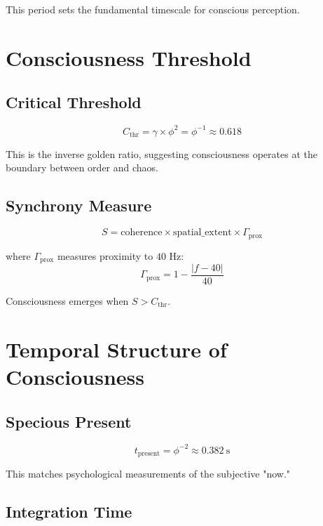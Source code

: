 \documentclass[12pt,a4paper]{article}
\begin{document}
This period sets the fundamental timescale for conscious perception.

\section{Consciousness Threshold}

\subsection{Critical Threshold}

\begin{equation}
C_{\text{thr}} = \gamma \times \phi^2 = \phi^{-1} \approx 0.618
\end{equation}

This is the inverse golden ratio, suggesting consciousness operates at the boundary between order and chaos.

\subsection{Synchrony Measure}

\begin{equation}
S = \text{coherence} \times \text{spatial\_extent} \times \Gamma_{\text{prox}}
\end{equation}

where $\Gamma_{\text{prox}}$ measures proximity to $40$ Hz:
\begin{equation}
\Gamma_{\text{prox}} = 1 - \frac{|f - 40|}{40}
\end{equation}

Consciousness emerges when $S > C_{\text{thr}}$.

\section{Temporal Structure of Consciousness}

\subsection{Specious Present}

\begin{equation}
t_{\text{present}} = \phi^{-2} \approx 0.382~\text{s}
\end{equation}

This matches psychological measurements of the subjective "now."

\subsection{Integration Time}
\end{document}
